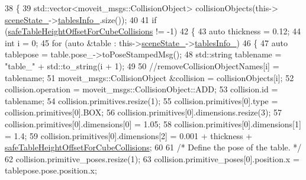 \begin{DoxyCode}
38         \{
39             std::vector<moveit\_msgs::CollisionObject> collisionObjects(this->
      \hyperlink{classsm__fetch__two__table__whiskey__pour_1_1cl__move__group__interface_1_1CpConstraintTableWorkspaces_a394e5c69c84b395bae91b0eafcb7342b}{sceneState\_}->\hyperlink{classsm__fetch__two__table__whiskey__pour_1_1cl__perception__system_1_1CpSceneState_a5d6fd3eb480fbb9a241c44ddd42c2930}{tablesInfo\_}.size());
40 
41             \textcolor{keywordflow}{if} (\hyperlink{classsm__fetch__two__table__whiskey__pour_1_1cl__move__group__interface_1_1CpConstraintTableWorkspaces_a16a18c331ca1476ec1fb021dc0c0be97}{safeTableHeightOffsetForCubeCollisions} != -1)
42             \{
43                 \textcolor{keyword}{auto} thickness = 0.12;
44                 \textcolor{keywordtype}{int} i = 0;
45                 \textcolor{keywordflow}{for} (\textcolor{keyword}{auto} &table : this->\hyperlink{classsm__fetch__two__table__whiskey__pour_1_1cl__move__group__interface_1_1CpConstraintTableWorkspaces_a394e5c69c84b395bae91b0eafcb7342b}{sceneState\_}->\hyperlink{classsm__fetch__two__table__whiskey__pour_1_1cl__perception__system_1_1CpSceneState_a5d6fd3eb480fbb9a241c44ddd42c2930}{tablesInfo\_})
46                 \{
47                     \textcolor{keyword}{auto} tablepose = table.pose\_->toPoseStampedMsg();
48                     std::string tablename = \textcolor{stringliteral}{"table\_"} + std::to\_string(i + 1);
49 
50                     \textcolor{comment}{//removeCollisionObjectNames[i] = tablename;}
51                     moveit\_msgs::CollisionObject &collision = collisionObjects[i];
52                     collision.operation = moveit\_msgs::CollisionObject::ADD;
53                     collision.id = tablename;
54                     collision.primitives.resize(1);
55                     collision.primitives[0].type = collision.primitives[0].BOX;
56                     collision.primitives[0].dimensions.resize(3);
57                     collision.primitives[0].dimensions[0] = 1.05;
58                     collision.primitives[0].dimensions[1] = 1.4;
59                     collision.primitives[0].dimensions[2] = 0.001 + thickness + 
      \hyperlink{classsm__fetch__two__table__whiskey__pour_1_1cl__move__group__interface_1_1CpConstraintTableWorkspaces_a16a18c331ca1476ec1fb021dc0c0be97}{safeTableHeightOffsetForCubeCollisions};
60 
61                     \textcolor{comment}{/* Define the pose of the table. */}
62                     collision.primitive\_poses.resize(1);
63                     collision.primitive\_poses[0].position.x = tablepose.pose.position.x;

\end{DoxyCode}
